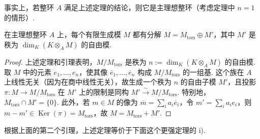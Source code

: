 \begin{remark*}
事实上，若整环 $A$ 满足上述定理的结论，则它是主理想整环（考虑定理中 $n=1$ 的情形）.
\end{remark*}
\begin{corollary*}
在主理想整环 $A$ 上，每个有限生成模 $M$ 都有分解 $M=M_{\mathrm{tors}}\oplus M'$，其中 $M'$ 是秩为 $\dim_K(K\otimes_A M)$ 的自由模.
\end{corollary*}
\begin{proof}
上述定理和引理表明，$M/M_{\mathrm{tors}}$ 是秩为 $n:=\dim_K(K\otimes_A M)$ 的自由模. 取 $M$ 中的元素 $e_1,\ldots,e_n$，使其像 $\overline e_1,\ldots,\overline e_n$ 构成 $M/M_{\mathrm{tors}}$ 的一组基. 这个族在 $A$ 上线性无关（因为在商中线性无关），故生成一个秩为 $n$ 的自由子模 $M'$，且投影 $\pi\colon M\longrightarrow M/M_{\mathrm{tors}}$ 在 $M'$ 上的限制是同构 $M'\xrightarrow{\sim}M/M_{\mathrm{tors}}$. 特别地，$M_{\mathrm{tors}}\cap M'=\{0\}$. 此外，若 $m\in M$ 的像为 $\overline m=\sum_i a_i\overline e_i$，令 $m'=\sum_i a_ie_i$，则 $m-m'\in\operatorname{Ker}(\pi)=M_{\mathrm{tors}}$，故 $M=M_{\mathrm{tors}}+M'$.
\end{proof}
根据上面的第二个引理，上述定理等价于下面这个更强定理的 i).
